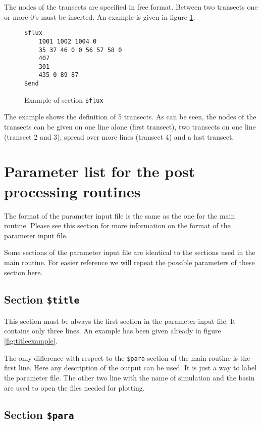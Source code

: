 \documentclass{report}
\begin{document}
The nodes of the transects are specified in free format. Between
two transects one or more 0's must be inserted. An example is given in
figure \ref{fig:fluxexample}.

\begin{figure}[ht]
\begin{verbatim}
$flux
	1001 1002 1004 0
	35 37 46 0 0 56 57 58 0
	407
	301
	435 0 89 87
$end
\end{verbatim}
\caption{Example of section {\tt \$flux}}
\label{fig:fluxexample}
\end{figure}

The example shows the definition of 5 transects. As can be seen, the 
nodes of the transects can be given on one line alone (first transect),
two transects on one line (transect 2 and 3), spread over more lines
(transect 4) and a last transect.



\section{Parameter list for the post processing routines}

The format of the parameter input file is the same as the one for
the main routine. Please see this section for more information
on the format of the parameter input file.

Some sections of the parameter input file are identical to the 
sections used in the main routine. For easier reference we will
repeat the possible parameters of these section here.






\subsection{Section {\tt \$title}}

This section must be always the first section in the parameter input file.
It contains only three lines. An example has been given already in 
figure \ref{fig:titleexample}.

The only difference with respect to the {\tt \$para} section of the main
routine is the first line. Here any description of the output can be used.
It is just a way to label the parameter file.  The other two line with
the name of simulation and the basin are used to open the files needed
for plotting.


\subsection{Section {\tt \$para}}
\end{document}
